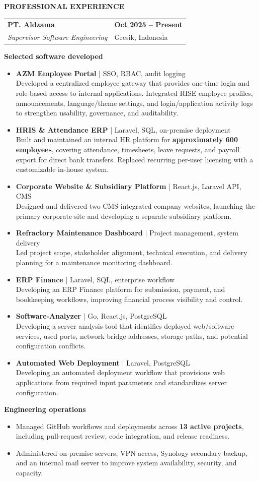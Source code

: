 \documentclass[a4paper,10pt]{article}
\makeatletter
\newcommand{\cvsection}[1]{%
  \par\vspace{7pt}
  {\color{navy}\bfseries\fontsize{10.5}{12}\selectfont #1}\par
  \vspace{2pt}{\color{teal}\hrule height 1.1pt}\vspace{4pt}
}
\newcommand{\role}[4]{%
  \begin{tabularx}{\linewidth}{@{}X>{\raggedleft\arraybackslash}p{3.65cm}@{}}
    \textbf{\color{navy}#1} & \textbf{\small #4}\\
    \textit{#2} & \textcolor{muted}{#3}
  \end{tabularx}\vspace{2pt}
}
\newcommand{\software}[3]{%
  \item \textbf{\color{navy}#1} \textcolor{muted}{\footnotesize | #2}\\[-1pt]
  #3
}
\newcommand{\impact}[1]{\item #1}
\newcommand{\compactliststart}{%
  \begin{itemize}[leftmargin=13pt,label={\color{teal}\raisebox{0.35ex}{\rule{3pt}{3pt}}},
    itemsep=3.5pt,topsep=1pt,parsep=0pt,partopsep=0pt]
}
\newcommand{\compactlistend}{\end{itemize}}
\newcommand{\plainliststart}{%
  \begin{itemize}[leftmargin=13pt,label={\color{teal}\textbullet},
    itemsep=2pt,topsep=1pt,parsep=0pt,partopsep=0pt]
}
\newcommand{\plainlistend}{\end{itemize}}
\makeatother
\begin{document}
\cvsection{PROFESSIONAL EXPERIENCE}
\role{PT. Aldzama}{Supervisor Software Engineering}{Gresik, Indonesia}{Oct 2025 -- Present}
{\small\textbf{Selected software developed}}
\compactliststart
  \software{AZM Employee Portal}{SSO, RBAC, audit logging}{Developed a centralized employee gateway that provides one-time login and role-based access to internal applications. Integrated RISE employee profiles, announcements, language/theme settings, and login/application activity logs to strengthen usability, governance, and auditability.}
  \software{HRIS \& Attendance ERP}{Laravel, SQL, on-premise deployment}{Built and maintained an internal HR platform for \textbf{approximately 600 employees}, covering attendance, timesheets, leave requests, and payroll export for direct bank transfers. Replaced recurring per-user licensing with a customizable in-house system.}
  \software{Corporate Website \& Subsidiary Platform}{React.js, Laravel API, CMS}{Designed and delivered two CMS-integrated company websites, launching the primary corporate site and developing a separate subsidiary platform.}
  \software{Refractory Maintenance Dashboard}{Project management, system delivery}{Led project scope, stakeholder alignment, technical execution, and delivery planning for a maintenance monitoring dashboard.}
  \software{ERP Finance}{Laravel, SQL, enterprise workflow}{Developing an ERP Finance platform for submission, payment, and bookkeeping workflows, improving financial process visibility and control.}
  \software{Software-Analyzer}{Go, React.js, PostgreSQL}{Developing a server analysis tool that identifies deployed web/software services, used ports, network bridge addresses, storage paths, and potential configuration conflicts.}
  \software{Automated Web Deployment}{Laravel, PostgreSQL}{Developing an automated deployment workflow that provisions web applications from required input parameters and standardizes server configuration.}
\compactlistend
{\small\textbf{Engineering operations}}
\plainliststart
  \impact{Managed GitHub workflows and deployments across \textbf{13 active projects}, including pull-request review, code integration, and release readiness.}
  \impact{Administered on-premise servers, VPN access, Synology secondary backup, and an internal mail server to improve system availability, security, and capacity.}
\plainlistend
\end{document}

